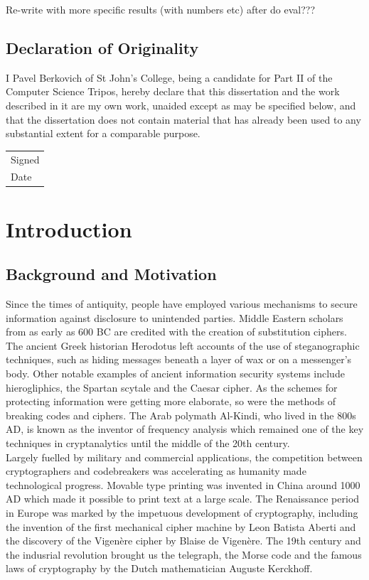 \documentclass[a4paper, 12pt]{report}
\newcommand{\skippage}{\newpage\null\newpage}
\begin{document}
{\color{red} 
Re-write with more specific results (with numbers etc) after do eval???}

\pagebreak
\section*{Declaration of Originality}
I Pavel Berkovich of St John's College, being a candidate for Part II of the Computer Science Tripos, hereby declare that this dissertation and the work described in it are my own work, unaided except as may be specified below, and that the dissertation does not contain material that has already been used to any substantial extent for a comparable purpose. \\[0.8cm]
\begin{tabular}{l}
    Signed \\[0.8cm]
    Date
\end{tabular}
\vfill

\tableofcontents

\skippage

\pagestyle{headings}

\chapter{Introduction}
\section{Background and Motivation}
Since the times of antiquity, people have employed various mechanisms to secure information against disclosure to unintended parties. Middle Eastern scholars from as early as 600 BC are credited with the creation of substitution ciphers. The ancient Greek historian Herodotus left accounts of the use of steganographic techniques, such as hiding messages beneath a layer of wax or on a messenger's body. Other notable examples of ancient information security systems include hierogliphics, the Spartan scytale and the Caesar cipher. As the schemes for protecting information were getting more elaborate, so were the methods of breaking codes and ciphers. The Arab polymath Al-Kindi, who lived in the 800s AD, is known as the inventor of frequency analysis which remained one of the key techniques in cryptanalytics until the middle of the 20th century. \\

Largely fuelled by military and commercial applications, the competition between cryptographers and codebreakers was accelerating as humanity made technological progress. Movable type printing was invented in China around 1000 AD which made it possible to print text at a large scale. The Renaissance period in Europe was marked by the impetuous development of cryptography, including the invention of the first mechanical cipher machine by Leon Batista Aberti and the discovery of the Vigen\`{e}re cipher by Blaise de Vigen\`{e}re. The 19th century and the indusrial revolution brought us the telegraph, the Morse code and the famous laws of cryptography by the Dutch mathematician Auguste Kerckhoff. \\ 
\end{document}
